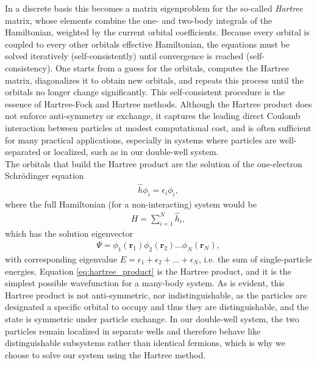 \documentclass{subfiles}
\begin{document}
In a discrete basis this becomes a matrix eigenproblem for the so-called \emph{Hartree} matrix, whose elements combine the one- and two-body integrals of the Hamiltonian, weighted by the current orbital coefficients. Because every orbital is coupled to every other orbitals effective Hamiltonian, the equations must be solved iteratively (self-consistently) until convergence is reached (self-consistency). One starts from a guess for the orbitals, computes the Hartree matrix, diagonalizes it to obtain new orbitals, and repeats this process until the orbitals no longer change significantly. This self-consistent procedure is the essence of Hartree-Fock and Hartree methods. Although the Hartree product does not enforce anti-symmetry or exchange, it captures the leading direct Coulomb interaction between particles at modest computational cost, and is often sufficient for many practical applications, especially in systems where particles are well-separated or localized, such as in our double-well system.
\\
The orbitals that build the Hartree product are the solution of the one-electron Schrödinger equation 
\begin{align*}
    \hat{h}\phi_i = \epsilon_i\phi_i,
\end{align*}
where the full Hamiltonian (for a non-interacting) system would be 
\begin{align*}
    H = \sum_{i=1}^N \hat{h}_i,
\end{align*}
which has the solution eigenvector
\begin{align}
    \Psi = \phi_1(\mathbf{r}_1)\phi_2(\mathbf{r}_2)...\phi_N(\mathbf{r}_N)\label{eq:hartree_product},
\end{align}
with corresponding eigenvalue $E = \epsilon_1 + \epsilon_2 + ... + \epsilon_N$, i.e. the sum of single-particle energies. Equation \eqref{eq:hartree_product} is the Hartree product, and it is the simplest possible wavefunction for a many-body system. As is evident, this Hartree product is not anti-symmetric, nor indistinguishable, as the particles are designated a specific orbital to occupy and thus they are distinguishable, and the state is symmetric under particle exchange.
In our double-well system, the two particles remain localized in separate wells and therefore behave like distinguishable subsystems rather than identical fermions, which is why we choose to solve our system using the Hartree method.
\\ 
\end{document}
